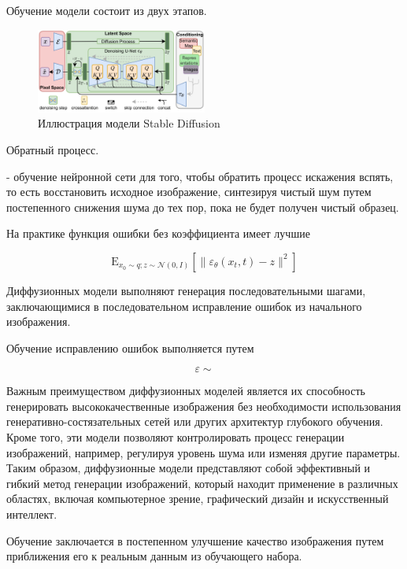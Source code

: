 Обучение модели состоит из двух этапов.


\begin{figure}[h]
    \centering
    \includegraphics[width=0.5\textwidth]{assets/ml/generation/stable_diffusion.png}
    \caption{Иллюстрация модели Stable Diffusion \cite{stablediffusion}}
    \label{sd_learning}
\end{figure}

Обратный процесс.

- обучение нейронной сети для того,
 чтобы обратить процесс искажения вспять, то есть восстановить исходное изображение,
  синтезируя чистый шум путем постепенного снижения шума до тех пор, пока не будет получен чистый образец.



На практике функция ошибки без коэффициента 
имеет лучшие

$$
    \mathrm{E}_{x_0 \sim q; z\sim \mathcal{N}(0,I)} 
    \left[ \| \varepsilon_\theta(x_t,t) -z \|^2\right]
$$


Диффузионных модели выполняют генерация последовательными шагами, заключающимися 
в последовательном исправление ошибок из начального изображения.

Обучение исправлению ошибок выполняется путем 

$$
    \varepsilon \sim 
$$


Важным преимуществом диффузионных моделей является их способность генерировать высококачественные изображения без необходимости использования генеративно-состязательных сетей или других архитектур глубокого обучения. Кроме того, эти модели позволяют контролировать процесс генерации изображений, например, регулируя уровень шума или изменяя другие параметры.
Таким образом, диффузионные модели представляют собой эффективный и гибкий метод генерации изображений, который находит применение в различных областях, включая компьютерное зрение, графический дизайн и искусственный интеллект.

Обучение заключается в постепенном улучшение качество изображения путем приближения его к реальным данным из обучающего набора.




